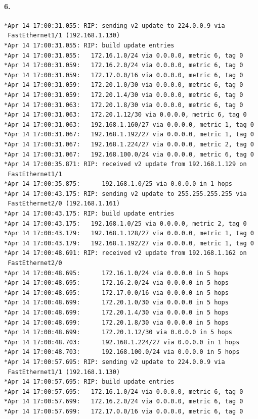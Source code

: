 \paragraph{6.}
\begin{verbatim}
*Apr 14 17:00:31.055: RIP: sending v2 update to 224.0.0.9 via
 FastEthernet1/1 (192.168.1.130)
*Apr 14 17:00:31.055: RIP: build update entries
*Apr 14 17:00:31.055: 	172.16.1.0/24 via 0.0.0.0, metric 6, tag 0
*Apr 14 17:00:31.059: 	172.16.2.0/24 via 0.0.0.0, metric 6, tag 0
*Apr 14 17:00:31.059: 	172.17.0.0/16 via 0.0.0.0, metric 6, tag 0
*Apr 14 17:00:31.059: 	172.20.1.0/30 via 0.0.0.0, metric 6, tag 0
*Apr 14 17:00:31.059: 	172.20.1.4/30 via 0.0.0.0, metric 6, tag 0
*Apr 14 17:00:31.063: 	172.20.1.8/30 via 0.0.0.0, metric 6, tag 0
*Apr 14 17:00:31.063: 	172.20.1.12/30 via 0.0.0.0, metric 6, tag 0
*Apr 14 17:00:31.063: 	192.168.1.160/27 via 0.0.0.0, metric 1, tag 0
*Apr 14 17:00:31.067: 	192.168.1.192/27 via 0.0.0.0, metric 1, tag 0
*Apr 14 17:00:31.067: 	192.168.1.224/27 via 0.0.0.0, metric 2, tag 0
*Apr 14 17:00:31.067: 	192.168.100.0/24 via 0.0.0.0, metric 6, tag 0
*Apr 14 17:00:35.871: RIP: received v2 update from 192.168.1.129 on
 FastEthernet1/1
*Apr 14 17:00:35.875:      192.168.1.0/25 via 0.0.0.0 in 1 hops
*Apr 14 17:00:43.175: RIP: sending v2 update to 255.255.255.255 via
 FastEthernet2/0 (192.168.1.161)
*Apr 14 17:00:43.175: RIP: build update entries
*Apr 14 17:00:43.175: 	192.168.1.0/25 via 0.0.0.0, metric 2, tag 0
*Apr 14 17:00:43.179: 	192.168.1.128/27 via 0.0.0.0, metric 1, tag 0
*Apr 14 17:00:43.179: 	192.168.1.192/27 via 0.0.0.0, metric 1, tag 0
*Apr 14 17:00:48.691: RIP: received v2 update from 192.168.1.162 on
 FastEthernet2/0
*Apr 14 17:00:48.695:      172.16.1.0/24 via 0.0.0.0 in 5 hops
*Apr 14 17:00:48.695:      172.16.2.0/24 via 0.0.0.0 in 5 hops
*Apr 14 17:00:48.695:      172.17.0.0/16 via 0.0.0.0 in 5 hops
*Apr 14 17:00:48.699:      172.20.1.0/30 via 0.0.0.0 in 5 hops
*Apr 14 17:00:48.699:      172.20.1.4/30 via 0.0.0.0 in 5 hops
*Apr 14 17:00:48.699:      172.20.1.8/30 via 0.0.0.0 in 5 hops
*Apr 14 17:00:48.699:      172.20.1.12/30 via 0.0.0.0 in 5 hops
*Apr 14 17:00:48.703:      192.168.1.224/27 via 0.0.0.0 in 1 hops
*Apr 14 17:00:48.703:      192.168.100.0/24 via 0.0.0.0 in 5 hops
*Apr 14 17:00:57.695: RIP: sending v2 update to 224.0.0.9 via
 FastEthernet1/1 (192.168.1.130)
*Apr 14 17:00:57.695: RIP: build update entries
*Apr 14 17:00:57.695: 	172.16.1.0/24 via 0.0.0.0, metric 6, tag 0
*Apr 14 17:00:57.699: 	172.16.2.0/24 via 0.0.0.0, metric 6, tag 0
*Apr 14 17:00:57.699: 	172.17.0.0/16 via 0.0.0.0, metric 6, tag 0

\end{verbatim}
